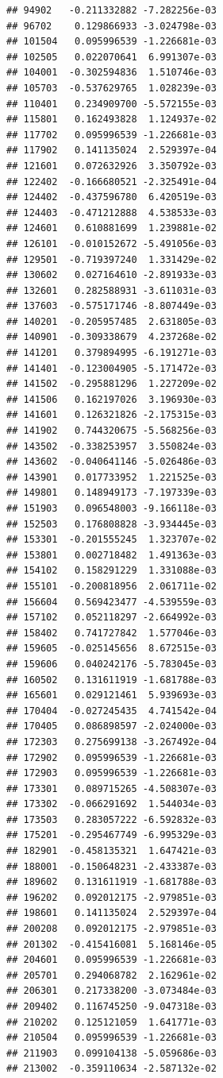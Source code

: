 \begin{frame}[fragile]
\begin{verbatim}
## 94902   -0.211332882 -7.282256e-03
## 96702    0.129866933 -3.024798e-03
## 101504   0.095996539 -1.226681e-03
## 102505   0.022070641  6.991307e-03
## 104001  -0.302594836  1.510746e-03
## 105703  -0.537629765  1.028239e-03
## 110401   0.234909700 -5.572155e-03
## 115801   0.162493828  1.124937e-02
## 117702   0.095996539 -1.226681e-03
## 117902   0.141135024  2.529397e-04
## 121601   0.072632926  3.350792e-03
## 122402  -0.166680521 -2.325491e-04
## 124402  -0.437596780  6.420519e-03
## 124403  -0.471212888  4.538533e-03
## 124601   0.610881699  1.239881e-02
## 126101  -0.010152672 -5.491056e-03
## 129501  -0.719397240  1.331429e-02
## 130602   0.027164610 -2.891933e-03
## 132601   0.282588931 -3.611031e-03
## 137603  -0.575171746 -8.807449e-03
## 140201  -0.205957485  2.631805e-03
## 140901  -0.309338679  4.237268e-02
## 141201   0.379894995 -6.191271e-03
## 141401  -0.123004905 -5.171472e-03
## 141502  -0.295881296  1.227209e-02
## 141506   0.162197026  3.196930e-03
## 141601   0.126321826 -2.175315e-03
## 141902   0.744320675 -5.568256e-03
## 143502  -0.338253957  3.550824e-03
## 143602  -0.040641146 -5.026486e-03
## 143901   0.017733952  1.221525e-03
## 149801   0.148949173 -7.197339e-03
## 151903   0.096548003 -9.166118e-03
## 152503   0.176808828 -3.934445e-03
## 153301  -0.201555245  1.323707e-02
## 153801   0.002718482  1.491363e-03
## 154102   0.158291229  1.331088e-03
## 155101  -0.200818956  2.061711e-02
## 156604   0.569423477 -4.539559e-03
## 157102   0.052118297 -2.664992e-03
## 158402   0.741727842  1.577046e-03
## 159605  -0.025145656  8.672515e-03
## 159606   0.040242176 -5.783045e-03
## 160502   0.131611919 -1.681788e-03
## 165601   0.029121461  5.939693e-03
## 170404  -0.027245435  4.741542e-04
## 170405   0.086898597 -2.024000e-03
## 172303   0.275699138 -3.267492e-04
## 172902   0.095996539 -1.226681e-03
## 172903   0.095996539 -1.226681e-03
## 173301   0.089715265 -4.508307e-03
## 173302  -0.066291692  1.544034e-03
## 173503   0.283057222 -6.592832e-03
## 175201  -0.295467749 -6.995329e-03
## 182901  -0.458135321  1.647421e-03
## 188001  -0.150648231 -2.433387e-03
## 189602   0.131611919 -1.681788e-03
## 196202   0.092012175 -2.979851e-03
## 198601   0.141135024  2.529397e-04
## 200208   0.092012175 -2.979851e-03
## 201302  -0.415416081  5.168146e-05
## 204601   0.095996539 -1.226681e-03
## 205701   0.294068782  2.162961e-02
## 206301   0.217338200 -3.073484e-03
## 209402   0.116745250 -9.047318e-03
## 210202   0.125121059  1.641771e-03
## 210504   0.095996539 -1.226681e-03
## 211903   0.099104138 -5.059686e-03
## 213002  -0.359110634 -2.587132e-02

\end{verbatim}
\end{frame}
